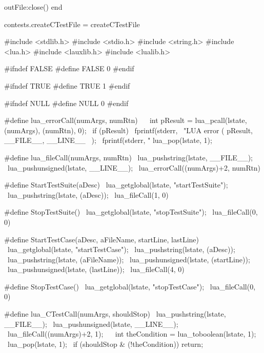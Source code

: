   outFile:close()
end

contests.createCTestFile = createCTestFile
\stopLuaCode

\startCHeader
#include <stdlib.h>
#include <stdio.h>
#include <string.h>
#include <lua.h>
#include <lauxlib.h>
#include <lualib.h>

#ifndef FALSE
#define FALSE 0
#endif

#ifndef TRUE
#define TRUE 1
#endif

#ifndef NULL
#define NULL 0
#endif

#define lua_errorCall(numArgs, numRtn)                     \
{                                                          \
  int pResult = lua_pcall(lstate, (numArgs), (numRtn), 0); \
  if (pResult) {                                           \
    fprintf(stderr,                                        \
      "LUA error (%
      pResult, __FILE__, __LINE__                          \
    );                                                     \
    fprintf(stderr, "%
    lua_pop(lstate, 1);                                    \
  }                                                        \
}

#define lua_fileCall(numArgs, numRtn)            \
  lua_pushstring(lstate, __FILE__);              \
  lua_pushunsigned(lstate, __LINE__);            \
  lua_errorCall((numArgs)+2, numRtn)

#define StartTestSuite(aDesc)              \
  lua_getglobal(lstate, "startTestSuite"); \
  lua_pushstring(lstate, (aDesc));         \
  lua_fileCall(1, 0)

#define StopTestSuite()                   \
  lua_getglobal(lstate, "stopTestSuite"); \
  lua_fileCall(0, 0)

#define StartTestCase(aDesc, aFileName, startLine, lastLine) \
  lua_getglobal(lstate, "startTestCase");                    \
  lua_pushstring(lstate, (aDesc));                           \
  lua_pushstring(lstate, (aFileName));                       \
  lua_pushunsigned(lstate, (startLine));                     \
  lua_pushunsigned(lstate, (lastLine));                      \
  lua_fileCall(4, 0)

#define StopTestCase()                   \
  lua_getglobal(lstate, "stopTestCase"); \
  lua_fileCall(0, 0)

#define lua_CTestCall(numArgs, shouldStop)       \
  lua_pushstring(lstate, __FILE__);              \
  lua_pushunsigned(lstate, __LINE__);            \
  lua_fileCall((numArgs)+2, 1);                  \
  {                                              \
    int theCondition = lua_toboolean(lstate, 1); \
    lua_pop(lstate, 1);                          \
    if (shouldStop & (!theCondition)) return;    \
  }
\stopCHeader

